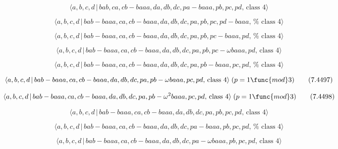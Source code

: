 \documentclass[10pt]{article}
\begin{document}
\begin{equation}
\langle a,b,c,d\,|\,bab,ca,cb-baaa,da,db,dc,pa-baaa,pb,pc,pd,\,\text{class }%
4\rangle  \tag{7.4492}
\end{equation}

\begin{equation}
\langle a,b,c,d\,|\,bab-baaa,ca,cb-baaa,da,db,dc,pa,pb,pc,pd-baaa,\,\text{%
class }4\rangle  \tag{7.4493}
\end{equation}

\begin{equation}
\langle a,b,c,d\,|\,bab-baaa,ca,cb-baaa,da,db,dc,pa,pb,pc-baaa,pd,\,\text{%
class }4\rangle  \tag{7.4494}
\end{equation}

\begin{equation}
\langle a,b,c,d\,|\,bab-baaa,ca,cb-baaa,da,db,dc,pa,pb,pc-\omega baaa,pd,\,%
\text{class }4\rangle  \tag{7.4495}
\end{equation}

\begin{equation}
\langle a,b,c,d\,|\,bab-baaa,ca,cb-baaa,da,db,dc,pa,pb-baaa,pc,pd,\,\text{%
class }4\rangle  \tag{7.4496}
\end{equation}

\begin{equation}
\langle a,b,c,d\,|\,bab-baaa,ca,cb-baaa,da,db,dc,pa,pb-\omega baaa,pc,pd,\,%
\text{class }4\rangle \;(p=1\func{mod}3)  \tag{7.4497}
\end{equation}

\begin{equation}
\langle a,b,c,d\,|\,bab-baaa,ca,cb-baaa,da,db,dc,pa,pb-\omega
^{2}baaa,pc,pd,\,\text{class }4\rangle \;(p=1\func{mod}3)  \tag{7.4498}
\end{equation}

\begin{equation}
\langle a,b,c,d\,|\,bab-baaa,ca,cb-baaa,da,db,dc,pa,pb,pc,pd,\,\text{class }%
4\rangle  \tag{7.4499}
\end{equation}

\begin{equation}
\langle a,b,c,d\,|\,bab-baaa,ca,cb-baaa,da,db,dc,pa-baaa,pb,pc,pd,\,\text{%
class }4\rangle  \tag{7.4500}
\end{equation}

\begin{equation}
\langle a,b,c,d\,|\,bab-baaa,ca,cb-baaa,da,db,dc,pa-\omega baaa,pb,pc,pd,\,%
\text{class }4\rangle  \tag{7.4501}
\end{equation}
\end{document}
